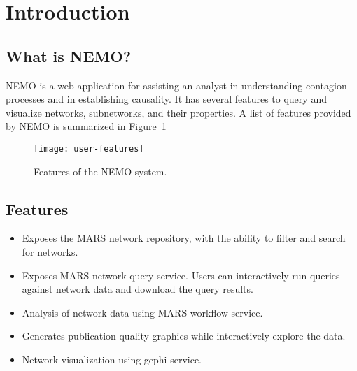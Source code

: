 

\section{Introduction}


\subsection{What is NEMO?}
NEMO is a web application for assisting an analyst in understanding contagion processes
and in establishing causality.
It has several features to query and visualize networks, subnetworks, and their properties. A list of features provided by NEMO is summarized in Figure~\ref{fig:user-features}

\begin{figure}[H]
\centering
\texttt{[image: user-features]}
\caption{
Features of the NEMO system.
}   %
\label{fig:user-features}
\end{figure}

\subsection{Features}

\begin{itemize}
\item Exposes the MARS network repository, with the ability to filter and search for networks.
\item Exposes MARS network query service. Users can interactively run queries against network data and download the query results.
\item Analysis of network data using MARS workflow service.
\item Generates publication-quality graphics while interactively explore the data.
\item Network visualization using gephi service.

\end{itemize}




